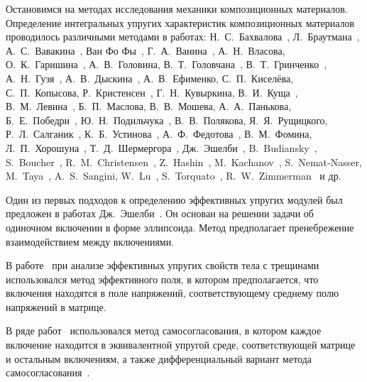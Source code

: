 Остановимся на методах исследования механики композиционных материалов. Определение интегральных упругих характеристик композиционных материалов проводилось различными методами в работах: Н.~С.~Бахвалова~\cite{Bahvalov}, Л.~Браутмана~\cite{Brautman}, А.~С.~Вавакина~\cite{Vavakin}, Ван Фо Фы~\cite{VanFoFiKo1971, VanFoFi1971}, Г.~А.~Ванина~\cite{Vanin1985, Vanin1994, Vanin1976, Vanin1980, Vanin1977}, А.~Н.~Власова, О.~К.~Гаришина~\cite{Garishin}, А.~В.~Головина, В.~Т.~Головчана~\cite{Golovchan1974, Golovchan1993, Golovchan1987, Golovchan2000}, В.~Т.~Гринченко~\cite{Grinchenko1965, Grinchenko1967, Grinchenko1985, Grinchenko1978}, А.~Н.~Гузя~\cite{Guz1968}, А.~В.~Дыскина~\cite{Diskin}, А.~В.~Ефименко, С.~П.~Киселёва, С.~П.~Копысова, Р.~Кристенсен~\cite{Kristensen}, Г.~Н.~Кувыркина, В.~И.~Куща~\cite{Kusch1995}, В.~М.~Левина~\cite{Levin}, Б.~П.~Маслова, В.~В.~Мошева, А.~А.~Панькова, Б.~Е.~Победри~\cite{Pobedrya}, Ю.~Н.~Подильчука~\cite{Podilchuk1967, Podilchuk1984}, В.~В.~Полякова, Я.~Я.~Рущицкого, Р.~Л.~Салганик~\cite{Salganik}, К.~Б.~Устинова~\cite{Ustinov}, А.~Ф.~Федотова~\cite{Fedotov}, В.~М.~Фомина, Л.~П.~Хорошуна~\cite{Khoroshun, Khoroshun2000-1, Khoroshun2000-2}, Т.~Д.~Шермергора~\cite{Schermergor}, Дж.~Эшелби~\cite{Eshelbi, Eshelby}, B.~Budiansky~\cite{Budiansky}, S.~Boucher~\cite{Boucher}, R.~M.~Christensen~\cite{Christensen, Christensen1990}, Z.~Hashin~\cite{Hashin, Hashin1983, Hashin1988, Hashin1963}, M.~Kachanov~\cite{Kachanov}, S.~Nemat-Nasser, M.~Taya~\cite{Nemat-Nasser}, A.~S.~Sangini, W.~Lu~\cite{Sangini}, S.~Torquato~\cite{Torquato}, R.~W.~Zimmerman~\cite{Zimmerman} и др.{\sloppy\par}

Один из первых подходов к определению эффективных упругих модулей был предложен в работах Дж.~Эшелби~\cite{Eshelbi, Eshelby}. Он основан на решении задачи об одиночном включении в форме эллипсоида. Метод предполагает пренебрежение взаимодействием между включениями.

В работе~\cite{Kachanov} при анализе эффективных упругих свойств тела с трещинами использовался метод эффективного поля, в котором предполагается, что включения находятся в поле напряжений, соответствующему среднему полю напряжений в матрице.

В ряде работ~\cite{Christensen1990} использовался метод самосогласования, в котором каждое включение находится в эквивалентной упругой среде, соответствующей матрице и остальным включениям, а также дифференциальный вариант метода самосогласования~\cite{Salganik, Vavakin, Zimmerman}.

